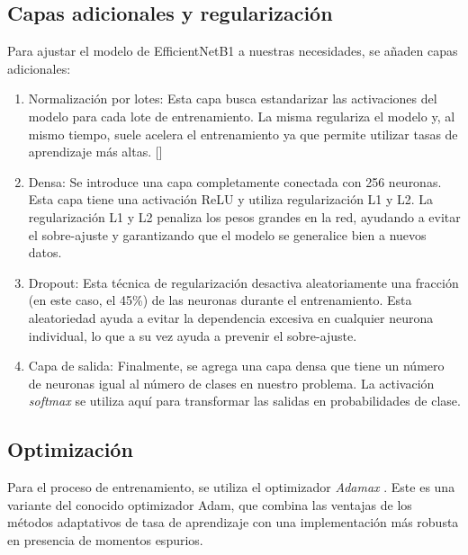 \subsection{Capas adicionales y regularización}

Para ajustar el modelo de EfficientNetB1 a nuestras necesidades, se añaden capas adicionales:

\begin{enumerate}
   \item Normalización por lotes: Esta capa busca estandarizar las activaciones del modelo para cada lote de entrenamiento. 
   La misma regulariza el modelo y, al mismo tiempo, suele acelera el entrenamiento ya que permite utilizar tasas de aprendizaje más altas. []

   \item Densa: Se introduce una capa completamente conectada con 256 neuronas. Esta capa tiene una activación ReLU y utiliza regularización L1 y L2.
   La regularización L1 y L2 penaliza los pesos grandes en la red, ayudando a evitar el sobre-ajuste y garantizando que el modelo se generalice
    bien a nuevos datos. 
   
   \item Dropout: Esta técnica de regularización desactiva aleatoriamente una fracción (en este caso, el 45\%) de las neuronas durante el 
   entrenamiento. Esta aleatoriedad ayuda a evitar la dependencia excesiva en cualquier neurona individual, lo que a su vez ayuda a prevenir
    el sobre-ajuste. 
   
   \item Capa de salida: Finalmente, se agrega una capa densa que tiene un número de neuronas igual al número de clases en nuestro problema. 
   La activación \textit{softmax} se utiliza aquí para transformar las salidas en probabilidades de clase.

\end{enumerate}

\subsection{Optimización}

Para el proceso de entrenamiento, se utiliza el optimizador \textit{Adamax} . Este es una variante del conocido optimizador Adam, que combina las ventajas de los métodos adaptativos de tasa de aprendizaje con una implementación más robusta en presencia de momentos espurios. 

